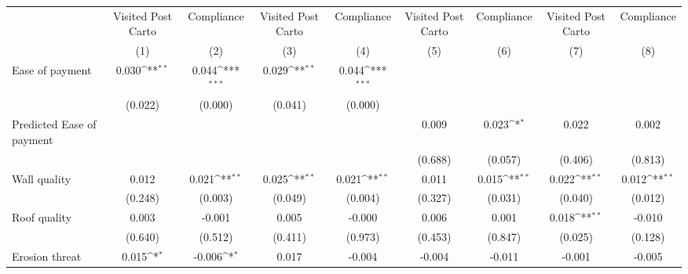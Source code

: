 {
\def\sym#1{\ifmmode^{#1}\else\(^{#1}\)\fi}
\begin{tabular}{l*{8}{c}}
\toprule
                &\multicolumn{1}{c}{Visited Post Carto}&\multicolumn{1}{c}{Compliance}&\multicolumn{1}{c}{Visited Post Carto}&\multicolumn{1}{c}{Compliance}&\multicolumn{1}{c}{Visited Post Carto}&\multicolumn{1}{c}{Compliance}&\multicolumn{1}{c}{Visited Post Carto}&\multicolumn{1}{c}{Compliance}\\
                &\multicolumn{1}{c}{(1)}         &\multicolumn{1}{c}{(2)}         &\multicolumn{1}{c}{(3)}         &\multicolumn{1}{c}{(4)}         &\multicolumn{1}{c}{(5)}         &\multicolumn{1}{c}{(6)}         &\multicolumn{1}{c}{(7)}         &\multicolumn{1}{c}{(8)}         \\
\midrule
Ease of payment &    0.030\sym{**} &    0.044\sym{***}&    0.029\sym{**} &    0.044\sym{***}&                  &                  &                  &                  \\
                &  (0.022)         &  (0.000)         &  (0.041)         &  (0.000)         &                  &                  &                  &                  \\
Predicted Ease of payment&                  &                  &                  &                  &    0.009         &    0.023\sym{*}  &    0.022         &    0.002         \\
                &                  &                  &                  &                  &  (0.688)         &  (0.057)         &  (0.406)         &  (0.813)         \\
Wall quality    &    0.012         &    0.021\sym{**} &    0.025\sym{**} &    0.021\sym{**} &    0.011         &    0.015\sym{**} &    0.022\sym{**} &    0.012\sym{**} \\
                &  (0.248)         &  (0.003)         &  (0.049)         &  (0.004)         &  (0.327)         &  (0.031)         &  (0.040)         &  (0.012)         \\
Roof quality    &    0.003         &   -0.001         &    0.005         &   -0.000         &    0.006         &    0.001         &    0.018\sym{**} &   -0.010         \\
                &  (0.640)         &  (0.512)         &  (0.411)         &  (0.973)         &  (0.453)         &  (0.847)         &  (0.025)         &  (0.128)         \\
Erosion threat  &    0.015\sym{*}  &   -0.006\sym{*}  &    0.017         &   -0.004         &   -0.004         &   -0.011         &   -0.001         &   -0.005         \\

\end{tabular}}
